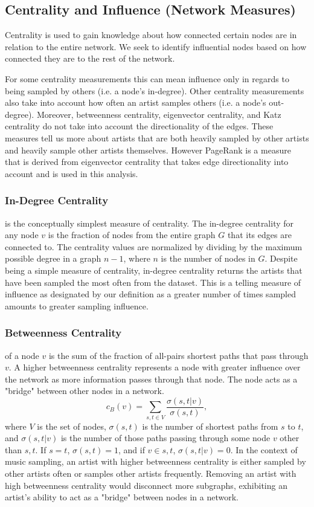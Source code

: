 \documentclass[pageno]{jpaper}
\begin{document}
\subsection{Centrality and Influence (Network Measures)}
Centrality is used to gain knowledge about how connected certain nodes are in relation to the entire network. We seek to identify influential nodes based on how connected they are to the rest of the network. 

For some centrality measurements this can mean influence only in regards to being sampled by others (i.e. a node's in-degree). Other centrality measurements also take into account how often an artist samples others (i.e. a node's out-degree). Moreover, betweenness centrality, eigenvector centrality, and Katz centrality do not take into account the directionality of the edges. These measures tell us more about artists that are both heavily sampled by other artists and heavily sample other artists themselves. However PageRank is a measure that is derived from eigenvector centrality that takes edge directionality into account and is used in this analysis.
\subsubsection{In-Degree Centrality}
is the conceptually simplest measure of centrality. The in-degree centrality for any node $v$ is the fraction of nodes from the entire graph $G$ that its edges are connected to. The centrality values are normalized by dividing by the maximum possible degree in a graph $n-1$, where $n$ is the number of nodes in $G$. Despite being a simple measure of centrality, in-degree centrality returns the artists that have been sampled the most often from the dataset. This is a telling measure of influence as designated by our definition as a greater number of times sampled amounts to greater sampling influence.
\subsubsection{Betweenness Centrality}
of a node $v$ is the sum of the fraction of all-pairs shortest paths that pass through $v$. A higher betweenness centrality represents a node with greater influence over the network as more information passes through that node. The node acts as a "bridge" between other nodes in a network.
\begin{equation}
c_B(v) =\sum_{s,t \in V} \frac{\sigma(s, t|v)}{\sigma(s, t)},
\end{equation}
where $V$ is the set of nodes, $\sigma(s,t)$ is the number of shortest paths from $s$ to $t$, and $\sigma(s,t|v)$ is the number of those paths passing through some node $v$ other than $s,t$. If $s=t$, $\sigma(s,t)=1$, and if $v\in s,t$, $\sigma(s,t|v)=0$. In the context of music sampling, an artist with higher betweenness centrality is either sampled by other artists often or samples other artists frequently. Removing an artist with high betweenness centrality would disconnect more subgraphs, exhibiting an artist's ability to act as a "bridge" between nodes in a network.
\end{document}
